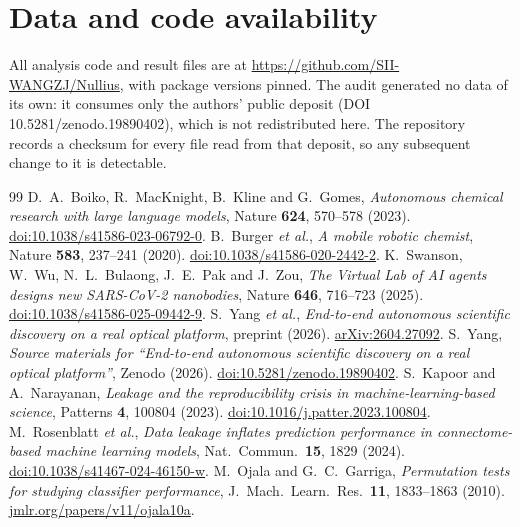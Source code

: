 \documentclass[11pt,a4paper]{article}
\newcommand{\doi}[1]{\href{https://doi.org/#1}{doi:#1}}
\newcommand{\arxivid}[1]{\href{https://arxiv.org/abs/#1}{arXiv:#1}}
\begin{document}
\section*{Data and code availability}
All analysis code and result files are at
\url{https://github.com/SII-WANGZJ/Nullius}, with package versions pinned. The
audit generated no data of its own: it consumes only the authors' public
deposit (DOI 10.5281/zenodo.19890402), which is not redistributed here. The
repository records a checksum for every file read from that deposit, so any
subsequent change to it is detectable.

\begin{thebibliography}{99}\small
{} D.~A.~Boiko, R.~MacKnight, B.~Kline and G.~Gomes,
  \emph{Autonomous chemical research with large language models},
  Nature \textbf{624}, 570--578 (2023). \doi{10.1038/s41586-023-06792-0}.
 B.~Burger \emph{et al.},
  \emph{A mobile robotic chemist}, Nature \textbf{583}, 237--241 (2020). \doi{10.1038/s41586-020-2442-2}.
 K.~Swanson, W.~Wu, N.~L.~Bulaong, J.~E.~Pak and J.~Zou,
  \emph{The Virtual Lab of AI agents designs new SARS-CoV-2 nanobodies},
  Nature \textbf{646}, 716--723 (2025). \doi{10.1038/s41586-025-09442-9}.
 S.~Yang \emph{et al.},
  \emph{End-to-end autonomous scientific discovery on a real optical
  platform}, preprint (2026). \arxivid{2604.27092}.
 S.~Yang, \emph{Source materials for
  ``End-to-end autonomous scientific discovery on a real optical platform''},
  Zenodo (2026). \doi{10.5281/zenodo.19890402}.
 S.~Kapoor and A.~Narayanan,
  \emph{Leakage and the reproducibility crisis in machine-learning-based
  science}, Patterns \textbf{4}, 100804 (2023). \doi{10.1016/j.patter.2023.100804}.
 M.~Rosenblatt \emph{et al.},
  \emph{Data leakage inflates prediction performance in connectome-based
  machine learning models}, Nat.\ Commun.\ \textbf{15}, 1829 (2024). \doi{10.1038/s41467-024-46150-w}.
 M.~Ojala and G.~C.~Garriga,
  \emph{Permutation tests for studying classifier performance},
  J.\ Mach.\ Learn.\ Res.\ \textbf{11}, 1833--1863 (2010). \href{https://www.jmlr.org/papers/v11/ojala10a.html}{jmlr.org/papers/v11/ojala10a}.

\end{thebibliography}
\end{document}
